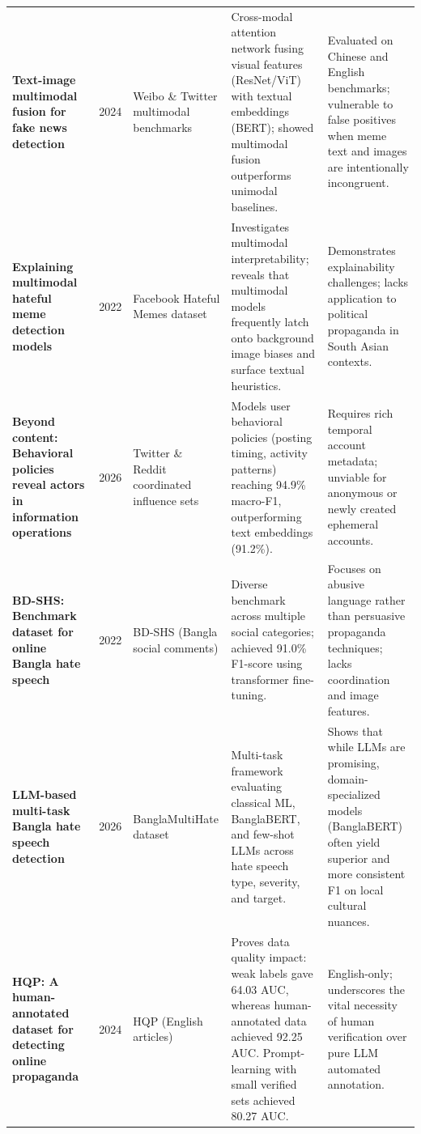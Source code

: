 \documentclass[12pt,a4paper]{report}
\begin{document}
\begin{longtable}{@{}L{3.1cm}C{0.8cm}L{2.2cm}L{3.5cm}L{3.3cm}@{}}
\addlinespace
\textbf{Text-image multimodal fusion for fake news detection}~\cite{lin2024} & 2024 & Weibo \& Twitter multimodal benchmarks &
Cross-modal attention network fusing visual features (ResNet/ViT) with textual embeddings (BERT); showed multimodal fusion outperforms unimodal baselines. &
Evaluated on Chinese and English benchmarks; vulnerable to false positives when meme text and images are intentionally incongruent.\\
\addlinespace
\textbf{Explaining multimodal hateful meme detection models}~\cite{hee2022} & 2022 & Facebook Hateful Memes dataset &
Investigates multimodal interpretability; reveals that multimodal models frequently latch onto background image biases and surface textual heuristics. &
Demonstrates explainability challenges; lacks application to political propaganda in South Asian contexts.\\
\addlinespace
\textbf{Beyond content: Behavioral policies reveal actors in information operations}~\cite{schneider2026} & 2026 & Twitter \& Reddit coordinated influence sets &
Models user behavioral policies (posting timing, activity patterns) reaching 94.9\% macro-F1, outperforming text embeddings (91.2\%). &
Requires rich temporal account metadata; unviable for anonymous or newly created ephemeral accounts.\\
\addlinespace
\textbf{BD-SHS: Benchmark dataset for online Bangla hate speech}~\cite{romim2022} & 2022 & BD-SHS (Bangla social comments) &
Diverse benchmark across multiple social categories; achieved 91.0\% F1-score using transformer fine-tuning. &
Focuses on abusive language rather than persuasive propaganda techniques; lacks coordination and image features.\\
\addlinespace
\textbf{LLM-based multi-task Bangla hate speech detection}~\cite{hasan2026} & 2026 & BanglaMultiHate dataset &
Multi-task framework evaluating classical ML, BanglaBERT, and few-shot LLMs across hate speech type, severity, and target. &
Shows that while LLMs are promising, domain-specialized models (BanglaBERT) often yield superior and more consistent F1 on local cultural nuances.\\
\addlinespace
\textbf{HQP: A human-annotated dataset for detecting online propaganda}~\cite{maarouf2024} & 2024 & HQP (English articles) &
Proves data quality impact: weak labels gave 64.03 AUC, whereas human-annotated data achieved 92.25 AUC. Prompt-learning with small verified sets achieved 80.27 AUC. &
English-only; underscores the vital necessity of human verification over pure LLM automated annotation.\\
\end{longtable}
\endgroup
\end{document}
